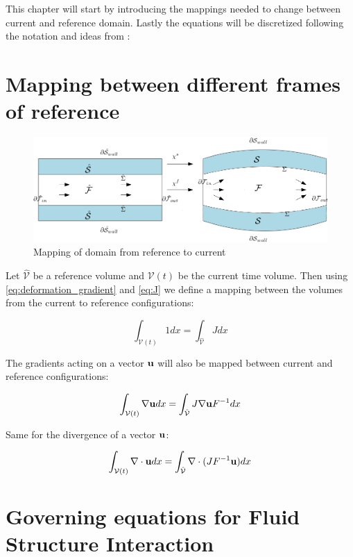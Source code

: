 This chapter will start by introducing the mappings needed to change between current and reference domain. Lastly the equations will be discretized following the notation and ideas from \cite{Richter2016}:

\section{Mapping between different frames of reference}
\begin{figure}[H]
\label{pic:FSI_mapping}
\includegraphics[scale=0.45]{./FSI_ALE_formulation/FSI_mapping.png}
\caption{Mapping of domain from reference to current}
\end{figure}

Let $\hat{\mathcal{V}}$ be a reference volume and $\mathcal{V}(t)$ be the current time volume. Then using \eqref{eq:deformation_gradient} and \eqref{eq:J} we define a mapping between the volumes from the current to reference configurations:

\begin{equation}
 \int_{\mathcal{V}(t)} 1  dx = \int_{\hat{\mathcal{V}}} J dx  
\end{equation}

The gradients acting on a vector $ \bold{u} $ will also be mapped between current and reference configurations:

\begin{equation}
\int_{\mathcal{V}(t)} \nabla \bold{u}   dx = \int_{\hat{\mathcal{V}}} J  \nabla \bold{u}F^{-1} dx  
\end{equation}

Same for the divergence of a vector $ \bold{u}$:

\begin{equation}
\int_{\mathcal{V}(t)} \nabla \cdot \bold{u}   dx = \int_{\hat{\mathcal{V}}} \nabla \cdot( J  F^{-1} \bold{u}) dx  
\end{equation}

\section{Governing equations for Fluid Structure Interaction}

